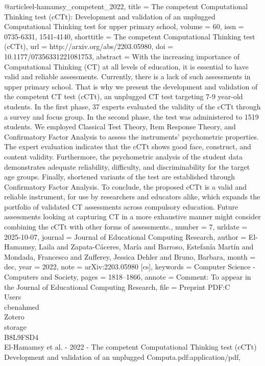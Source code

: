@article{el-hamamsy_competent_2022,
	title = {The competent {Computational} {Thinking} test ({cCTt}): {Development} and validation of an unplugged 
{Computational} {Thinking} test for upper primary school},
	volume = {60},
	issn = {0735-6331, 1541-4140},
	shorttitle = {The competent {Computational} {Thinking} test ({cCTt})},
	url = {http://arxiv.org/abs/2203.05980},
	doi = {10.1177/07356331221081753},
	abstract = {With the increasing importance of Computational Thinking (CT) at all levels of education, it is essential to 
have valid and reliable assessments. Currently, there is a lack of such assessments in upper primary school. That is why we 
present the development and validation of the competent CT test (cCTt), an unplugged CT test targeting 7-9 year-old students. In 
the first phase, 37 experts evaluated the validity of the cCTt through a survey and focus group. In the second phase, the test 
was administered to 1519 students. We employed Classical Test Theory, Item Response Theory, and Confirmatory Factor Analysis to 
assess the instruments' psychometric properties. The expert evaluation indicates that the cCTt shows good face, construct, and 
content validity. Furthermore, the psychometric analysis of the student data demonstrates adequate reliability, difficulty, and 
discriminability for the target age groups. Finally, shortened variants of the test are established through Confirmatory Factor 
Analysis. To conclude, the proposed cCTt is a valid and reliable instrument, for use by researchers and educators alike, which 
expands the portfolio of validated CT assessments across compulsory education. Future assessments looking at capturing CT in a 
more exhaustive manner might consider combining the cCTt with other forms of assessments.},
	number = {7},
	urldate = {2025-10-07},
	journal = {Journal of Educational Computing Research},
	author = {El-Hamamsy, Laila and Zapata-Cáceres, María and Barroso, Estefanía Martín and Mondada, Francesco and Zufferey, 
Jessica Dehler and Bruno, Barbara},
	month = dec,
	year = {2022},
	note = {arXiv:2203.05980 [cs]},
	keywords = {Computer Science - Computers and Society},
	pages = {1818--1866},
	annote = {Comment: To appear in the Journal of Educational Computing Research},
	file = {Preprint PDF:C\:\\Users\\cbenahmed\\Zotero\\storage\\B8L9FSD4\\El-Hamamsy et al. - 2022 - The competent 
Computational Thinking test (cCTt) Development and validation of an unplugged Computa.pdf:application/pdf},
}

